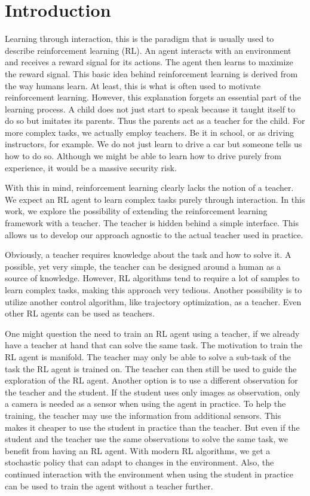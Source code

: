 \chapter{Introduction}
\label{ch:Introduction}

Learning through interaction, this is the paradigm that is usually used to describe reinforcement learning (RL). An agent interacts with an environment and receives a reward signal for its actions. The agent then learns to maximize the reward signal. This basic idea behind reinforcement learning is derived from the way humans learn. \cite{suttonReinforcementLearningIntroduction2018}
At least, this is what is often used to motivate reinforcement learning. However, this explanation forgets an essential part of the learning process. A child does not just start to speak because it taught itself to do so but imitates its parents. Thus the parents act as a teacher for the child. For more complex tasks, we actually employ teachers. Be it in school, or as driving instructors, for example. We do not just learn to drive a car but someone tells us how to do so. Although we might be able to learn how to drive purely from experience, it would be a massive security risk.

With this in mind, reinforcement learning clearly lacks the notion of a teacher. We expect an RL agent to learn complex tasks purely through interaction. In this work, we explore the possibility of extending the reinforcement learning framework with a teacher. The teacher is hidden behind a simple interface. This allows us to develop our approach agnostic to the actual teacher used in practice.

Obviously, a teacher requires knowledge about the task and how to solve it. A possible, yet very simple, the teacher can be designed around a human as a source of knowledge. However, RL algorithms tend to require a lot of samples to learn complex tasks, making this approach very tedious. Another possibility is to utilize another control algorithm, like trajectory optimization, as a teacher. Even other RL agents can be used as teachers.

One might question the need to train an RL agent using a teacher, if we already have a teacher at hand that can solve the same task. The motivation to train the RL agent is manifold. The teacher may only be able to solve a sub-task of the task the RL agent is trained on. The teacher can then still be used to guide the exploration of the RL agent. Another option is to use a different observation for the teacher and the student. If the student uses only images as observation, only a camera is needed as a sensor when using the agent in practice. To help the training, the teacher may use the information from additional sensors. This makes it cheaper to use the student in practice than the teacher. But even if the student and the teacher use the same observations to solve the same task, we benefit from having an RL agent. With modern RL algorithms, we get a stochastic policy that can adapt to changes in the environment. Also, the continued interaction with the environment when using the student in practice can be used to train the agent without a teacher further.

